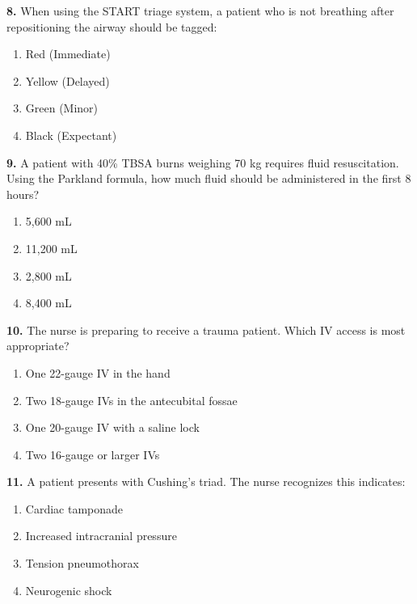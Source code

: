 \documentclass[11pt]{article}
\begin{document}
\vspace{0.3cm}

\textbf{8.} When using the START triage system, a patient who is not breathing after repositioning the airway should be tagged:

\begin{enumerate}[label=\Alph*.]
    \item Red (Immediate)
    \item Yellow (Delayed)
    \item Green (Minor)
    \item Black (Expectant)
\end{enumerate}

\vspace{0.3cm}

\textbf{9.} A patient with 40\% TBSA burns weighing 70 kg requires fluid resuscitation. Using the Parkland formula, how much fluid should be administered in the first 8 hours?

\begin{enumerate}[label=\Alph*.]
    \item 5,600 mL
    \item 11,200 mL
    \item 2,800 mL
    \item 8,400 mL
\end{enumerate}

\vspace{0.3cm}

\textbf{10.} The nurse is preparing to receive a trauma patient. Which IV access is most appropriate?

\begin{enumerate}[label=\Alph*.]
    \item One 22-gauge IV in the hand
    \item Two 18-gauge IVs in the antecubital fossae
    \item One 20-gauge IV with a saline lock
    \item Two 16-gauge or larger IVs
\end{enumerate}

\vspace{0.3cm}

\textbf{11.} A patient presents with Cushing's triad. The nurse recognizes this indicates:

\begin{enumerate}[label=\Alph*.]
    \item Cardiac tamponade
    \item Increased intracranial pressure
    \item Tension pneumothorax
    \item Neurogenic shock
\end{enumerate}
\end{document}
